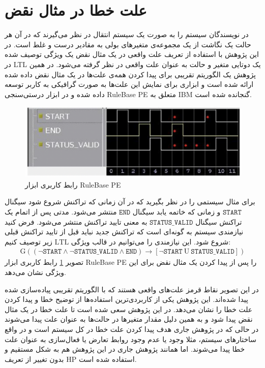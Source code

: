 \documentclass[
msc,
irfonts
]{./tex/tehran-thesis}
\newcommand{\پ}{پروژه/پایان‌نامه/رساله }
\theoremstyle{definition}
\theoremstyle{theorem}
\theoremstyle{definition}
\numberwithin{algorithm}{chapter}
\newcommand{\ra}{\rightarrow}
\newcommand{\mr}[1]{\mathrm{#1}}
\newcommand{\lf}[1]{\LTRfootnote{#1}}
\begin{document}
\section{علت خطا در مثال نقض}
در
\cite{chockler}
نویسندگان سیستم را به صورت یک سیستم انتقال\lf{Transition System}
در نظر می‌گیرند که در آن هر حالت یک نگاشت از یک مجموعه‌ی متغیر‌های بولی به مقادیر درست و غلط است.
در این پژوهش با استفاده از تعریف علت واقعی در یک مثال نقض یک ویژگی توصیف شده در
LTL\lf{Linear Temporal Logic}
یک دوتایی‌ متغیر و حالت به عنوان علت واقعی در نظر گرفته می‌شود.
در همین پژوهش یک الگوریتم تقریبی برای پیدا کردن همه‌ی علت‌ها در یک مثال نقض داده شده ارائه شده است و ابزاری برای نمایش این علت‌ها به صورت گرافیکی به کاربر توسعه داده شده و در ابزار درستی‌سنجی
RuleBase PE
متعلق به
IBM
گنجانده شده است.
\begin{figure}
    \centering
    \includegraphics[width=15cm]{chockler.png}
    \caption{رابط کاربری ابزار
        RuleBase PE
    }
    \label{fig:rulebase}
\end{figure}
برای مثال
سیستمی را در نظر بگیرید که در آن زمانی که تراکنش شروع شود سیگنال 
$\texttt{START}$
و زمانی که خاتمه یابد سیگنال 
$\texttt{END}$
منتشر می‌شود.
مدتی پس از اتمام یک تراکنش سیگنال 
$\texttt{STATUS\_VALID}$
به معنی تایید تراکنش منتشر می‌شود.
فرض کنید نیازمندی سیستم به گونه‌ای است که تراکنش جدید نباید قبل از تایید تراکنش قبلی شروع شود. 
این نیازمندی را می‌توانیم در قالب ویژگی 
$\mr{LTL}$
زیر توصیف کنیم:
\begin{align*}
    \boldsymbol{\mr{G}}((\neg \texttt{START} \wedge \neg \texttt{STATUS\_VALID} \wedge \texttt{END}) 
    \ra [\neg \texttt{START}\ \boldsymbol{\mr{U}}\ \texttt{STATUS\_VALID}])
\end{align*}
تصویر
\ref{fig:rulebase}
رابط کاربری ابزار 
RuleBase PE
را پس از پیدا کردن یک مثال نقض برای این ویژگی نشان می‌دهد.

در این تصویر نقاط قرمز علت‌های واقعی هستند که با الگوریتم تقریبی پیاده‌سازی شده پیدا شده‌اند.
 این پژوهش یکی از کاربردی‌ترین استفاده‌ها از توضیح خطا و پیدا کردن علت خطا را نشان می‌دهد. 
در این پژوهش سعی شده است تا علت خطا در یک مثال نقض پیدا شود و به همین دلیل مقدار متغیر‌ها در حالت‌ها به عنوان علت پیدا می‌شوند در حالی که در پژوهش جاری هدف پیدا کردن علت خطا در کل سیستم است و در واقع ساختار‌های سیستم، مثلا وجود یا عدم وجود روابط تعارض یا فعال‌سازی به عنوان علت خطا پیدا می‌شوند.
اما همانند پژوهش جاری در این پژوهش هم به شکل مستقیم و بدون تغییر از تعریف 
HP
استفاده شده است.
\end{document}
